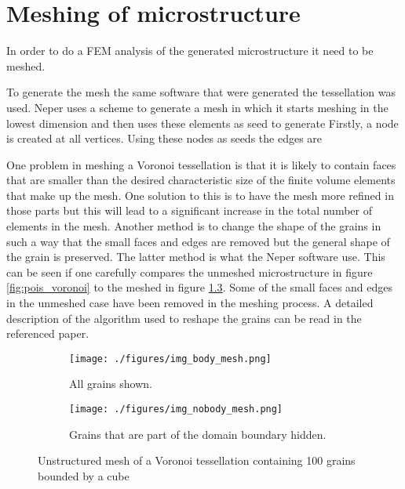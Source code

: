 \documentclass[meshing_micro.tex]{subfiles}
\begin{document}
\chapter{Meshing of microstructure}

In order to do a FEM analysis of the generated microstructure it need to be meshed.




 To generate the mesh the same software that were generated the tessellation was used. Neper uses a scheme to generate a mesh in which it starts meshing in the lowest dimension and then uses these elements as seed to generate  Firstly, a node is created at all vertices. Using these nodes as seeds the edges are 


One problem in meshing a Voronoi tessellation is that it is likely to contain faces that are smaller than the desired characteristic size of the finite volume elements that make up the mesh. One solution to this is to have the mesh more refined in those    parts but this will lead to a significant increase in the total number of elements in the mesh. Another method is to change the shape of the grains in such a way that the small faces and edges are removed but the general shape of the grain is preserved. The latter method is what the Neper software use. This can be seen if one carefully compares the unmeshed microstructure in figure \ref{fig:pois_voronoi} to the meshed in figure \ref{fig:pois_voronoi_mesh}. Some of the small faces and edges in the unmeshed case have been removed in the meshing process. A detailed description of the algorithm used to reshape the grains can be read in the referenced paper.


 
 \begin{figure}
\centering
\begin{subfigure}[b]{.5\textwidth}
  \centering
  \texttt{[image: ./figures/img\_body\_mesh.png]}
  \caption{All grains shown.}
  \label{fig:pois_voronoi_a_mesh}
\end{subfigure}%
\begin{subfigure}[b]{.5\textwidth}
  \centering
  \texttt{[image: ./figures/img\_nobody\_mesh.png]}
  \caption{Grains that are part of the domain boundary hidden.}
  \label{fig:pois_voronoi_b_mesh}
\end{subfigure}
\caption{Unstructured mesh of a Voronoi tessellation containing 100 grains bounded by a cube}
\label{fig:pois_voronoi_mesh}
\end{figure}
\end{document}
